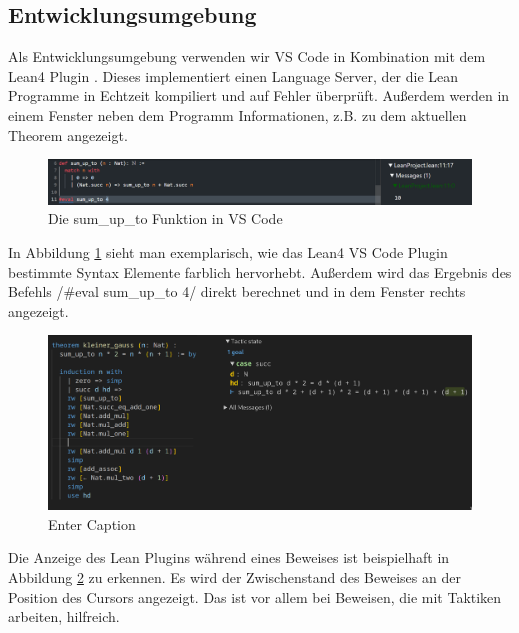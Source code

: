 \documentclass[10pt]{article}
\begin{document}
\subsection{Entwicklungsumgebung}
Als Entwicklungsumgebung verwenden wir VS Code in Kombination mit dem Lean4 Plugin \cite{Q3}. Dieses implementiert einen Language Server, der die Lean Programme in Echtzeit kompiliert und auf Fehler überprüft. Außerdem werden in einem Fenster neben dem Programm Informationen, z.B. zu dem aktuellen Theorem angezeigt.
\begin{figure}[H]
    \centering
    \includegraphics[width=0.95\linewidth]{Abbildung sum_up_to.png}
    \caption{Die sum\_up\_to Funktion in VS Code}
    \label{Abb sum_up_to}
\end{figure}
\vspace{-0.2cm}
\noindent In Abbildung \ref{Abb sum_up_to} sieht man exemplarisch, wie das Lean4 VS Code Plugin bestimmte Syntax Elemente farblich hervorhebt. Außerdem wird das Ergebnis des Befehls \lean/#eval sum_up_to 4/ direkt berechnet und in dem Fenster rechts angezeigt.
\vspace{-0.2cm}
\hspace{-0.4cm}
\begin{figure}[H]
    \centering
    \includegraphics[width=0.65\linewidth]{kleiner_gauss.png}
    \caption{Enter Caption}
    \label{Abb Enter Caption}
\end{figure}
\noindent Die Anzeige des Lean Plugins während eines Beweises ist beispielhaft in Abbildung \ref{Abb Enter Caption} zu erkennen. Es wird der Zwischenstand des Beweises an der Position des Cursors angezeigt. Das ist vor allem bei Beweisen, die mit Taktiken arbeiten, hilfreich.
\end{document}
